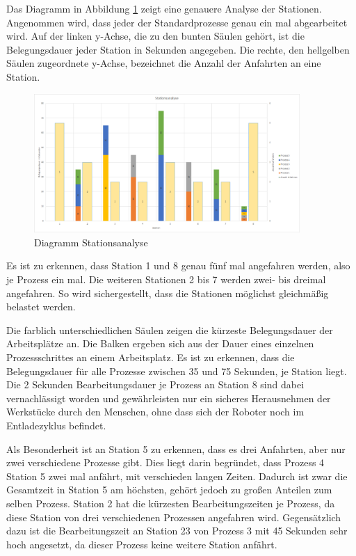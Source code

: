 Das Diagramm in Abbildung \ref{fig:Stationsanalyse} zeigt eine genauere Analyse der Stationen. Angenommen wird, dass jeder der Standardprozesse genau ein mal abgearbeitet wird. Auf der linken y-Achse, die zu den bunten Säulen gehört, ist die Belegungsdauer jeder Station in Sekunden angegeben. Die rechte, den hellgelben Säulen zugeordnete y-Achse, bezeichnet die Anzahl der Anfahrten an eine Station. 

\begin{figure}[htb]
    \centering
    \includegraphics[width=0.9\textwidth]{Abbildungen/Stationsanalyse.PNG}
    \caption{Diagramm Stationsanalyse}		
    \label{fig:Stationsanalyse}
\end{figure}

Es ist zu erkennen, dass Station 1 und 8 genau fünf mal angefahren werden, also je Prozess ein mal. Die weiteren Stationen 2 bis 7 werden zwei- bis dreimal angefahren. So wird sichergestellt, dass die Stationen möglichst gleichmäßig belastet werden. 

Die farblich unterschiedlichen Säulen zeigen die kürzeste Belegungsdauer der Arbeitsplätze an. Die Balken ergeben sich aus der Dauer eines einzelnen Prozessschrittes an einem Arbeitsplatz. Es ist zu erkennen, dass die Belegungsdauer für alle Prozesse zwischen 35 und 75 Sekunden, je Station liegt. Die 2 Sekunden Bearbeitungsdauer je Prozess an Station 8 sind dabei vernachlässigt worden und gewährleisten nur ein sicheres Herausnehmen der Werkstücke durch den Menschen, ohne dass sich der Roboter noch im Entladezyklus befindet. 

Als Besonderheit ist an Station 5 zu erkennen, dass es drei Anfahrten, aber nur zwei verschiedene Prozesse gibt. Dies liegt darin begründet, dass Prozess 4 Station 5 zwei mal anfährt, mit verschieden langen Zeiten. Dadurch ist zwar die Gesamtzeit in Station 5 am höchsten, gehört jedoch zu großen Anteilen zum selben Prozess. Station 2 hat die kürzesten Bearbeitungszeiten je Prozess, da diese Station von drei verschiedenen Prozessen angefahren wird. Gegensätzlich dazu ist die Bearbeitungszeit an Station 23 von Prozess 3 mit 45 Sekunden sehr hoch angesetzt, da dieser Prozess keine weitere Station anfährt. 


